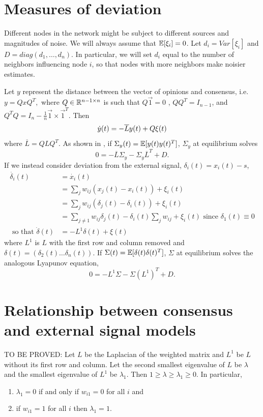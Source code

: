 \documentclass{article}
\begin{document}
\section{Measures of deviation\label{deviations}}
Different nodes in the network might be subject to different sources and magnitudes of noise.  We will always assume that ${\mathbb{E}}[\xi_i]=0$.  Let $d_i=Var[\xi_i]$ and $D=diag(d_1,\dots,d_n)$.  In particular, we will set $d_i$ equal to the number of neighbors influencing node $i$, so that nodes with more neighbors make noisier estimates.

Let $y$ represent the distance between the vector of opinions and consensus, i.e.
$y=QxQ^T,$
where $Q\in{\mathbb{R}}^{n-1\times n}$ is such that $Q\vec{1}=0$ , $QQ^T=I_{n-1}$, and $Q^TQ=I_n-\frac{1}{n}\vec{1}\times\vec{1}^T$.   
Then 
\begin{equation}
\dot{y}(t)=-\overline{L}y(t)+Q\xi(t) \notag
\end{equation}
where $\overline{L}=QLQ^T$.  As shown in \cite{Young:2010fk}, if $\Sigma_y(t)={\mathbb{E}}[y(t)y(t)^T]$,  $\Sigma_y$ at equilibrium solves
\begin{equation} 0=-\overline{L}\Sigma_y-\Sigma_y\overline{L}^T+D. \label{h2norm}
\end{equation}
If we instead consider deviation from the external signal, $\delta_i(t)=x_i(t)-s$,
\begin{align*}
\dot{\delta_i}(t)&=\dot{x_i}(t)
\\&=\sum_jw_{ij}(x_j(t)-x_i(t))+\xi_i(t)
\\&=\sum_jw_{ij}(\delta_j(t)-\delta_i(t))+\xi_i(t)
\\&=\sum_{j\neq 1}w_{ij}\delta_j(t)-\delta_i(t)\sum_jw_{ij}+\xi_i(t) \text{ since $\delta_1(t)\equiv 0$}
\\ \text{ so that }\dot{\delta}(t)&=-L^1\delta(t)+\xi(t)
\end{align*}
where $L^1$ is $L$ with the first row and column removed and $\delta(t)=(\delta_2(t)\dots\delta_n(t))$.
If $\Sigma(t)={\mathbb{E}}[\delta(t)\delta(t)^T]$,  $\Sigma$ at equilibrium solves the analogous Lyapunov equation,
\begin{equation}
0=-L^1\Sigma-\Sigma(L^1)^T+D. \label{h2mod}
\end{equation}

\section{Relationship between consensus and external signal models}
\begin{claim} \label{myconjecture}
TO BE PROVED:  Let $L$ be the Laplacian of the weighted matrix and $L^1$ be $L$ without its first row and column.  Let the second smallest eigenvalue of $L$ be $\lambda$ and the smallest eigenvalue of $L^1$ be $\lambda_1$.  Then $1\geq \lambda \geq \lambda_1\geq 0$.  In particular,
\begin{enumerate}
\item $\lambda_1=0$ if and only if $w_{i1}=0$ for all $i$ and
\item if $w_{i1}=1$ for all $i$ then $\lambda_1=1$.
\end{enumerate}
\end{claim}
\end{document}
